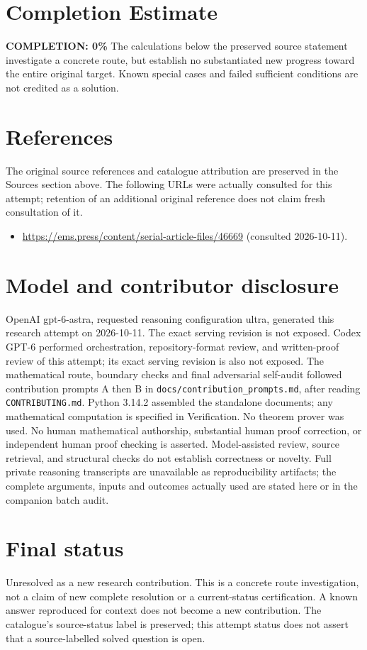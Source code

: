 \documentclass[11pt]{article}
\begin{document}
\section{Completion Estimate}
\noindent\textbf{COMPLETION: 0\%}
The calculations below the preserved source statement investigate a concrete route,
but establish no substantiated new progress toward the entire original target.
Known special cases and failed sufficient conditions are not credited as a solution.
\section{References}
The original source references and catalogue attribution are preserved in the
Sources section above. The following URLs were actually consulted for this attempt;
retention of an additional original reference does not claim fresh consultation of it.
\begin{itemize}
\item \url{https://ems.press/content/serial-article-files/46669} (consulted 2026-10-11). 
\end{itemize}
\section{Model and contributor disclosure}
OpenAI gpt-6-astra, requested reasoning configuration ultra, generated this research
attempt on 2026-10-11. The exact serving revision is not exposed. Codex GPT-6
performed orchestration, repository-format review, and written-proof review of this attempt; its exact serving revision
is also not exposed. The mathematical route, boundary checks and final adversarial
self-audit followed contribution prompts A then B in
\texttt{docs/contribution\_prompts.md}, after reading \texttt{CONTRIBUTING.md}.
Python 3.14.2 assembled the standalone documents; any mathematical computation is
specified in Verification. No theorem prover was used. No human mathematical
authorship, substantial human proof correction, or independent human proof checking
is asserted. Model-assisted review, source retrieval, and structural checks do not
establish correctness or novelty. Full private reasoning transcripts are unavailable
as reproducibility artifacts; the complete arguments, inputs and outcomes actually
used are stated here or in the companion batch audit.
\section{Final status}
Unresolved as a new research contribution. This is a concrete route investigation,
not a claim of new complete resolution or a current-status certification. A known
answer reproduced for context does not become a new contribution. The catalogue's
source-status label is preserved; this attempt status does not assert that a
source-labelled solved question is open.
\end{document}
